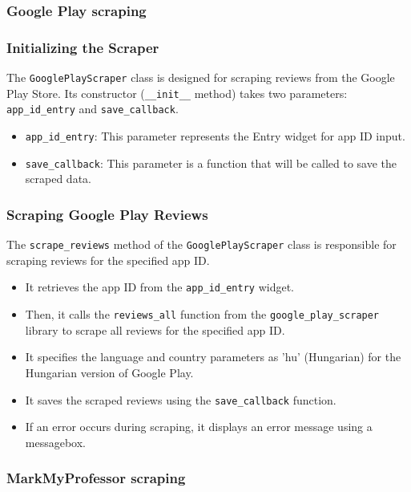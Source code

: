 \clearpage
\subsubsection*{Google Play scraping}
\subsubsection*{Initializing the Scraper}
The \texttt{GooglePlayScraper} class is designed for scraping reviews from the Google Play Store. Its constructor (\texttt{\_\_init\_\_} method) takes two parameters: \texttt{app\_id\_entry} and \texttt{save\_callback}.

\begin{itemize}
    \item \texttt{app\_id\_entry}: This parameter represents the Entry widget for app ID input.
    \item \texttt{save\_callback}: This parameter is a function that will be called to save the scraped data.
\end{itemize}

\subsubsection*{Scraping Google Play Reviews}
The \texttt{scrape\_reviews} method of the \texttt{GooglePlayScraper} class is responsible for scraping reviews for the specified app ID.

\begin{itemize}
    \item It retrieves the app ID from the \texttt{app\_id\_entry} widget.
    \item Then, it calls the \texttt{reviews\_all} function from the \texttt{google\_play\_scraper} library to scrape all reviews for the specified app ID.
    \item It specifies the language and country parameters as 'hu' (Hungarian) for the Hungarian version of Google Play.
    \item It saves the scraped reviews using the \texttt{save\_callback} function.
    \item If an error occurs during scraping, it displays an error message using a messagebox.
\end{itemize}

\subsubsection*{MarkMyProfessor scraping}
